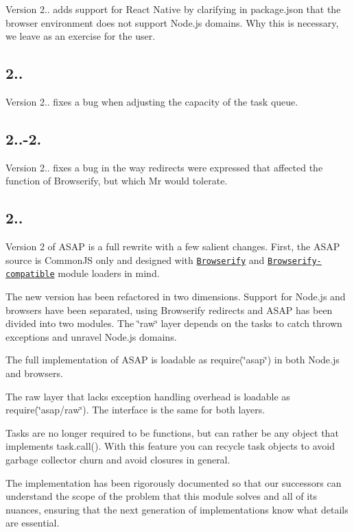 Version 2.. adds support for React Native by clarifying in package.\+json that the browser environment does not support Node.\+js domains. Why this is necessary, we leave as an exercise for the user.

\subsection*{2..}

Version 2.. fixes a bug when adjusting the capacity of the task queue.

\subsection*{2..-\/2.}

Version 2.. fixes a bug in the way redirects were expressed that affected the function of Browserify, but which Mr would tolerate.

\subsection*{2..}

Version 2 of A\+S\+AP is a full rewrite with a few salient changes. First, the A\+S\+AP source is Common\+JS only and designed with \href{https://github.com/substack/node-browserify}{\tt Browserify} and \href{https://github.com/montagejs/mr}{\tt Browserify-\/compatible} module loaders in mind.

The new version has been refactored in two dimensions. Support for Node.\+js and browsers have been separated, using Browserify redirects and A\+S\+AP has been divided into two modules. The \char`\"{}raw\char`\"{} layer depends on the tasks to catch thrown exceptions and unravel Node.\+js domains.

The full implementation of A\+S\+AP is loadable as {\ttfamily require(\char`\"{}asap\char`\"{})} in both Node.\+js and browsers.

The raw layer that lacks exception handling overhead is loadable as {\ttfamily require(\char`\"{}asap/raw\char`\"{})}. The interface is the same for both layers.

Tasks are no longer required to be functions, but can rather be any object that implements {\ttfamily task.\+call()}. With this feature you can recycle task objects to avoid garbage collector churn and avoid closures in general.

The implementation has been rigorously documented so that our successors can understand the scope of the problem that this module solves and all of its nuances, ensuring that the next generation of implementations know what details are essential.


